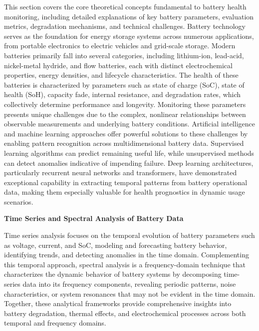 This section covers the core theoretical concepts fundamental to battery health monitoring, including detailed explanations of key battery parameters, evaluation metrics, degradation mechanisms, and technical challenges. Battery technology serves as the foundation for energy storage systems across numerous applications, from portable electronics to electric vehicles and grid-scale storage. Modern batteries primarily fall into several categories, including lithium-ion, lead-acid, nickel-metal hydride, and flow batteries, each with distinct electrochemical properties, energy densities, and lifecycle characteristics. The health of these batteries is characterized by parameters such as state of charge (SoC), state of health (SoH), capacity fade, internal resistance, and degradation rates, which collectively determine performance and longevity. Monitoring these parameters presents unique challenges due to the complex, nonlinear relationships between observable measurements and underlying battery conditions. Artificial intelligence and machine learning approaches offer powerful solutions to these challenges by enabling pattern recognition across multidimensional battery data. Supervised learning algorithms can predict remaining useful life, while unsupervised methods can detect anomalies indicative of impending failure. Deep learning architectures, particularly recurrent neural networks and transformers, have demonstrated exceptional capability in extracting temporal patterns from battery operational data, making them especially valuable for health prognostics in dynamic usage scenarios.


\textbf{Time Series and Spectral Analysis of Battery Data}

Time series analysis focuses on the temporal evolution of battery parameters such as voltage, current, and SoC, modeling and forecasting battery behavior, identifying trends, and detecting anomalies in the time domain. Complementing this temporal approach, spectral analysis is a frequency-domain technique that characterizes the dynamic behavior of battery systems by decomposing time-series data into its frequency components, revealing periodic patterns, noise characteristics, or system resonances that may not be evident in the time domain. Together, these analytical frameworks provide comprehensive insights into battery degradation, thermal effects, and electrochemical processes across both temporal and frequency domains.

